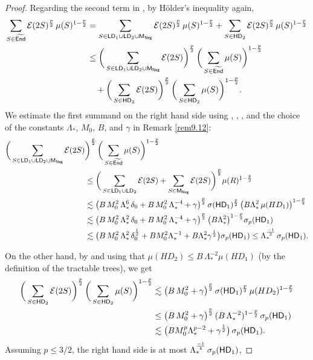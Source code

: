 \begin{proof}
Regarding the second term in , by H\"older's inequality again,
\begin{align*}
\sum_{S\in{\widetilde{{\mathsf{End}}}}}{\mathcal E}(2S)^{\frac{p}2} \,\mu(S)^{1-\frac {p}2} &= 
\sum_{S\in{\mathsf{LD}}_1\cup {\mathsf{LD}}_2\cup{\mathsf{M}}_{\mathsf{Neg}}}
{\mathcal E}(2S)^{\frac{p}2} \,\mu(S)^{1-\frac {p}2} + \sum_{S\in{\mathsf{HD}}_2}
{\mathcal E}(2S)^{\frac{p}2} \,\mu(S)^{1-\frac {p}2}\\
& \leq \bigg(\sum_{S\in{\mathsf{LD}}_1\cup {\mathsf{LD}}_2\cup{\mathsf{M}}_{\mathsf{Neg}}}{\mathcal E}(2S)\bigg)^{\frac{p}2} \,\bigg(\sum_{S\in{\widetilde{{\mathsf{End}}}}} \mu(S)\bigg)^{1-\frac {p}2} \\
&\quad + 
\bigg(\sum_{S\in{\mathsf{HD}}_2}{\mathcal E}(2S)\bigg)^{\frac{p}2} \,\bigg(\sum_{S\in{\mathsf{HD}}_2} \mu(S)\bigg)^{1-\frac {p}2} 
.
\end{align*}
We estimate the first summand on the right hand side using , , ,
and the choice of the constants $\Lambda_*$, $M_0$, $B$, and $\gamma$ in Remark \ref{rem9.12}:
\begin{align*}
\bigg(\sum_{S\in{\mathsf{LD}}_1\cup {\mathsf{LD}}_2\cup{\mathsf{M}}_{\mathsf{Neg}}}{\mathcal E}(2S)&\bigg)^{\frac{p}2} \,\bigg(\sum_{S\in{\widetilde{{\mathsf{End}}}}} \mu(S)\bigg)^{1-\frac {p}2} \\
& \leq \bigg(
\sum_{S\in
{\mathsf{LD}}_1\cup {\mathsf{LD}}_2} {\mathcal E}(2S)  + \sum_{S\in{\mathsf{M}}_{\mathsf{Neg}}} {\mathcal E}(2S)\bigg)^{\frac{p}2}
\mu(R)^{1-\frac p2}
 \\
& \lesssim \big(B\,M_0^2\,\Lambda_*^6\,\delta_0 + B\,M_0^2\,\Lambda_*^{-4}
+\gamma\big)^{\frac{p}2}\,\sigma({\mathsf{HD}}_1)^{\frac{p}2}\,\big(B\Lambda_*^2\,\mu(HD_1)\big)^{1-\frac p2}\\
& \lesssim \big(B\,M_0^2\,\Lambda_*^2\,\delta_0 + B\,M_0^2\,\Lambda_*^{-4}
+\gamma\big)^{\frac{p}2}\,\big(B\Lambda_*^2\big)^{1-\frac p2}\sigma_p({\mathsf{HD}}_1)\\
& \lesssim
\big(B\,M_0^2\,\Lambda_*^2\,\delta_0^{\frac12}  + BM_0^2\Lambda_*^{-1}
+B\Lambda_*^2\gamma^{\frac12}\big) \sigma_p({\mathsf{HD}}_1)\leq \Lambda_*^{\frac{-1}2}\,\sigma_p({\mathsf{HD}}_1).
\end{align*}

On the other hand, by  and using that $\mu(HD_2)\leq B\,\Lambda_*^{-2}\mu(HD_1)$ (by the definition of the tractable trees), we get
\begin{align*}
\bigg(\sum_{S\in{\mathsf{HD}}_2}{\mathcal E}(2S)\bigg)^{\frac{p}2} \,\bigg(\sum_{S\in{\mathsf{HD}}_2} \mu(S)\bigg)^{1-\frac {p}2} 
&\lesssim
\big(B\,M_0^2 + \gamma\big)^{\frac p2}\,\sigma({\mathsf{HD}}_1)^{\frac p2}\,\mu(HD_2)^{1-\frac p2}\\
&\leq
\big(B\,M_0^2 + \gamma\big)^{\frac p2}\,(B\,\Lambda_*^{-2})^{1-\frac p2}\,\sigma_p({\mathsf{HD}}_1)\\
& \lesssim \big(BM_0^p\Lambda_*^{p-2} + \gamma^{\frac12}\big)\,\sigma_p({\mathsf{HD}}_1).
\end{align*}
Assuming $p\leq3/2$, the right hand side is at most $\Lambda_*^{\frac{-1}4}\,\sigma_p({\mathsf{HD}}_1)$,


\end{proof}
